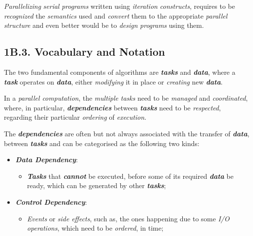 \emph{Parallelizing} \emph{serial} \emph{programs} written using \emph{iteration} \emph{constructs}, requires to be \emph{recognized} the \emph{semantics} used and \emph{convert} them to the appropriate \emph{parallel structure} and even better would be to \emph{design} \emph{programs} using them.

\vspace{0.5cm}

\subsection*{\large{\textbf{1B.3. Vocabulary and Notation}}}
\label{ssec:lecture-1B3}

\noindent The two fundamental components of algorithms are \textbf{\emph{tasks}} and \textbf{\emph{data}}, where a \textbf{\emph{task}} operates on \textbf{\emph{data}}, either \emph{modifying} it in place or \emph{creating} new \textbf{\emph{data}}.

In a \emph{parallel computation}, the \emph{multiple tasks} need to be \emph{managed} and \emph{coordinated}, where, in particular, \textbf{\emph{dependencies}} between \textbf{\emph{tasks}} need to be \emph{respected}, regarding their particular \emph{ordering} of \emph{execution}.

\vspace{0.35cm}

\noindent The \textbf{\emph{dependencies}} are often but not always associated with the transfer of \textbf{\emph{data}}, between \textbf{\emph{tasks}} and can be categorised as the following two kinds:
\begin{itemize}
    \vspace{-0.2cm}
    \item \textbf{\emph{Data Dependency}}:
    \begin{itemize}
        \vspace{-0.2cm}
        \item \textbf{\emph{Tasks}} that \textbf{\emph{cannot}} be executed, before some of its required \textbf{\emph{data}} be ready, which can be generated by other \textbf{\emph{tasks}};
    \end{itemize}
    \vspace{-0.2cm}
    \item \textbf{\emph{Control Dependency}}:
    \begin{itemize}
        \vspace{-0.2cm}
        \item \emph{Events} or \emph{side effects}, such as, the ones happening due to some \emph{I/O operations}, which need to be \emph{ordered}, in time;
    \end{itemize}
\end{itemize}

